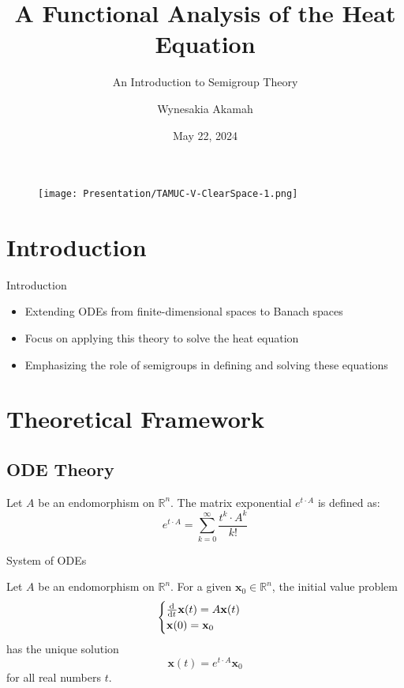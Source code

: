 \documentclass{beamer}
\author{Wynesakia Akamah}
\title{A Functional Analysis of the Heat Equation}
\subtitle{An Introduction to Semigroup Theory}
\institute{
    Department of Mathematics \\
    Rose-Hulman Institute of Technology
}
\date{\small May 22, 2024}
\begin{document}
\begin{frame}
    \titlepage
    \vspace*{-0.6cm}
    \begin{figure}[htpb]
        \centering
        \texttt{[image: Presentation/TAMUC-V-ClearSpace-1.png]}
    \end{figure}
\end{frame}

\begin{frame}
    \tableofcontents[sectionstyle=show, subsectionstyle=show/shaded/hide, subsubsectionstyle=show/shaded/hide]
\end{frame}

\section{Introduction}

\begin{frame}{Introduction}
    \begin{itemize}[<+-| alert@+>]
        \item Extending ODEs from finite-dimensional spaces to Banach spaces
        \item Focus on applying this theory to solve the heat equation
        \item Emphasizing the role of semigroups in defining and solving these equations
    \end{itemize}
\end{frame}

\section{Theoretical Framework}

\subsection{ODE Theory}
\begin{frame}
    \begin{definition}
    Let \(A\) be an endomorphism on \(\mathbb{R}^n\). The matrix exponential \(e^{t \cdot A}\) is defined as:
    \[
    e^{t \cdot A} = \sum_{k=0}^{\infty} \frac{t^k \cdot A^k}{k!}
    \]
    \end{definition}
\end{frame}

\begin{frame}{System of ODEs}
    \begin{theorem}
    Let \(A\) be an endomorphism on \(\mathbb{R}^n\). For a given \(\mathbf{x}_0 \in \mathbb{R}^n\), the initial value problem
    \[
    \begin{cases}
        \diff{t} \mathbf{x}(t) = A \mathbf{x}(t) \\
        \mathbf{x}(0) = \mathbf{x}_0
    \end{cases}
    \]
    has the unique solution
    \[
    \mathbf{x}(t) = e^{t \cdot A} \mathbf{x}_0
    \]
    for all real numbers \(t\).
\end{theorem}
\end{frame}
\end{document}
